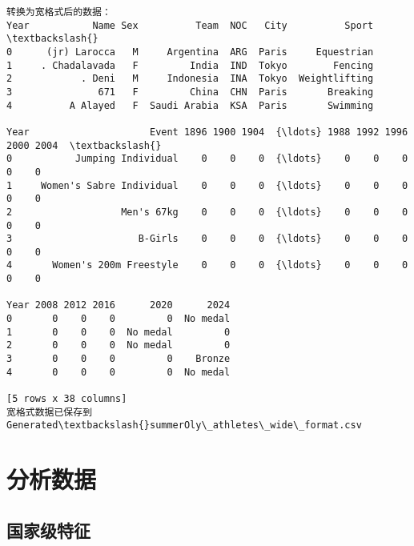 \documentclass[11pt]{article}
\begin{document}
    \begin{Verbatim}[commandchars=\\\{\}]
转换为宽格式后的数据：
Year           Name Sex          Team  NOC   City          Sport  \textbackslash{}
0      (jr) Larocca   M     Argentina  ARG  Paris     Equestrian
1     . Chadalavada   F         India  IND  Tokyo        Fencing
2            . Deni   M     Indonesia  INA  Tokyo  Weightlifting
3               671   F         China  CHN  Paris       Breaking
4          A Alayed   F  Saudi Arabia  KSA  Paris       Swimming

Year                     Event 1896 1900 1904  {\ldots} 1988 1992 1996 2000 2004  \textbackslash{}
0           Jumping Individual    0    0    0  {\ldots}    0    0    0    0    0
1     Women's Sabre Individual    0    0    0  {\ldots}    0    0    0    0    0
2                   Men's 67kg    0    0    0  {\ldots}    0    0    0    0    0
3                      B-Girls    0    0    0  {\ldots}    0    0    0    0    0
4       Women's 200m Freestyle    0    0    0  {\ldots}    0    0    0    0    0

Year 2008 2012 2016      2020      2024
0       0    0    0         0  No medal
1       0    0    0  No medal         0
2       0    0    0  No medal         0
3       0    0    0         0    Bronze
4       0    0    0         0  No medal

[5 rows x 38 columns]
宽格式数据已保存到 Generated\textbackslash{}summerOly\_athletes\_wide\_format.csv
    \end{Verbatim}

    \section{分析数据}\label{ux5206ux6790ux6570ux636e}

    \subsection{国家级特征}\label{ux56fdux5bb6ux7ea7ux7279ux5f81}
\end{document}
